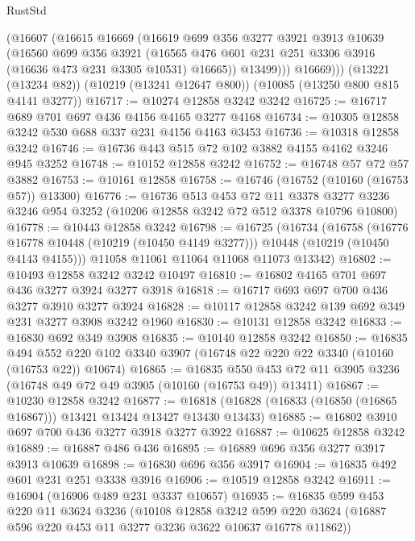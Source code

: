 \begin{lexlean}{RustStd}
\begin{coremodule}
          (@16607
            (@16615
              @16669
              (@16619
                @699
                @356
                @3277
                @3921
                @3913
                @10639
                (@16560
                  @699
                  @356
                  @3921
                  (@16565 @476 @601 @231 @251 @3306 @3916 (@16636 @473 @231 @3305 @10531) @16665))
                @13499)))
          @16669)))
    (@13221 (@13234 @82))
    (@10219 (@13241 @12647 @800))
    (@10085 (@13250 @800 @815 @4141 @3277))
@16717 := @10274 @12858 @3242 @3242
@16725 := @16717 @689 @701 @697 @436 @4156 @4165 @3277 @4168
@16734 := @10305 @12858 @3242 @530 @688 @337 @231 @4156 @4163 @3453
@16736 := @10318 @12858 @3242
@16746 := @16736 @443 @515 @72 @102 @3882 @4155 @4162 @3246 @945 @3252
@16748 := @10152 @12858 @3242
@16752 := @16748 @57 @72 @57 @3882
@16753 := @10161 @12858
@16758 := @16746 (@16752 (@10160 (@16753 @57)) @13300)
@16776 := @16736
    @513
    @453
    @72
    @11
    @3378
    @3277
    @3236
    @3246
    @954
    @3252
    (@10206 @12858 @3242 @72 @512 @3378 @10796 @10800)
@16778 := @10443 @12858 @3242
@16798 := @16725
    (@16734
      (@16758
        (@16776 @16778 @10448 (@10219 (@10450 @4149 @3277)))
        @10448
        (@10219 (@10450 @4143 @4155)))
      @11058
      @11061
      @11064
      @11068
      @11073
      @13342)
@16802 := @10493 @12858 @3242 @3242 @10497
@16810 := @16802 @4165 @701 @697 @436 @3277 @3924 @3277 @3918
@16818 := @16717 @693 @697 @700 @436 @3277 @3910 @3277 @3924
@16828 := @10117 @12858 @3242 @139 @692 @349 @231 @3277 @3908 @3242 @1960
@16830 := @10131 @12858 @3242
@16833 := @16830 @692 @349 @3908
@16835 := @10140 @12858 @3242
@16850 := @16835
    @494
    @552
    @220
    @102
    @3340
    @3907
    (@16748 @22 @220 @22 @3340 (@10160 (@16753 @22)) @10674)
@16865 := @16835
    @550
    @453
    @72
    @11
    @3905
    @3236
    (@16748 @49 @72 @49 @3905 (@10160 (@16753 @49)) @13411)
@16867 := @10230 @12858 @3242
@16877 := @16818 (@16828 (@16833 (@16850 (@16865 @16867))) @13421 @13424 @13427 @13430 @13433)
@16885 := @16802 @3910 @697 @700 @436 @3277 @3918 @3277 @3922
@16887 := @10625 @12858 @3242
@16889 := @16887 @486 @436
@16895 := @16889 @696 @356 @3277 @3917 @3913 @10639
@16898 := @16830 @696 @356 @3917
@16904 := @16835 @492 @601 @231 @251 @3338 @3916
@16906 := @10519 @12858 @3242
@16911 := @16904 (@16906 @489 @231 @3337 @10657)
@16935 := @16835
    @599
    @453
    @220
    @11
    @3624
    @3236
    (@10108
      @12858
      @3242
      @599
      @220
      @3624
      (@16887 @596 @220 @453 @11 @3277 @3236 @3622 @10637 @16778 @11862))

\end{coremodule}
\end{lexlean}
